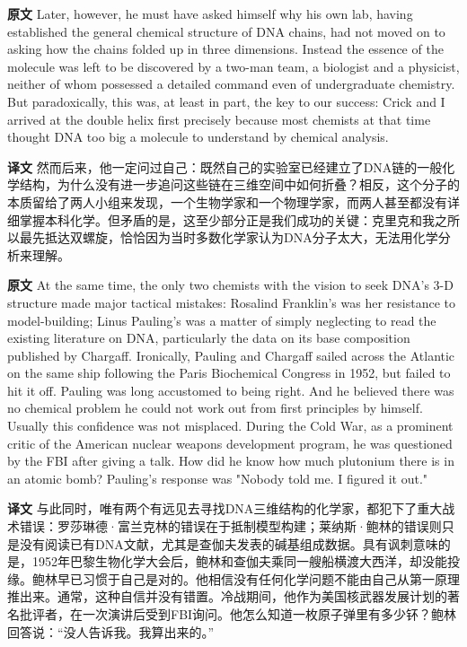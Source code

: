 \documentclass[UTF8,zihao=-4]{ctexart}
\newcommand{\BodyFont}{\fontsize{10.5pt}{15.5pt}\selectfont}
\renewenvironment{quote}{\par\noindent\begingroup\BodyFont}{\par\endgroup}
\begin{document}
\begin{quote}
\noindent\textbf{原文} Later, however, he must have asked himself why his own lab, having established the general chemical structure of DNA chains, had not moved on to asking how the chains folded up in three dimensions. Instead the essence of the molecule was left to be discovered by a two-man team, a biologist and a physicist, neither of whom possessed a detailed command even of undergraduate chemistry. But paradoxically, this was, at least in part, the key to our success: Crick and I arrived at the double helix first precisely because most chemists at that time thought DNA too big a molecule to understand by chemical analysis.

\smallskip
\noindent\textbf{译文} 然而后来，他一定问过自己：既然自己的实验室已经建立了DNA链的一般化学结构，为什么没有进一步追问这些链在三维空间中如何折叠？相反，这个分子的本质留给了两人小组来发现，一个生物学家和一个物理学家，而两人甚至都没有详细掌握本科化学。但矛盾的是，这至少部分正是我们成功的关键：克里克和我之所以最先抵达双螺旋，恰恰因为当时多数化学家认为DNA分子太大，无法用化学分析来理解。
\end{quote}

\begin{quote}
\noindent\textbf{原文} At the same time, the only two chemists with the vision to seek DNA's 3-D structure made major tactical mistakes: Rosalind Franklin's was her resistance to model-building; Linus Pauling's was a matter of simply neglecting to read the existing literature on DNA, particularly the data on its base composition published by Chargaff. Ironically, Pauling and Chargaff sailed across the Atlantic on the same ship following the Paris Biochemical Congress in 1952, but failed to hit it off. Pauling was long accustomed to being right. And he believed there was no chemical problem he could not work out from first principles by himself. Usually this confidence was not misplaced. During the Cold War, as a prominent critic of the American nuclear weapons development program, he was questioned by the FBI after giving a talk. How did he know how much plutonium there is in an atomic bomb? Pauling's response was "Nobody told me. I figured it out."

\smallskip
\noindent\textbf{译文} 与此同时，唯有两个有远见去寻找DNA三维结构的化学家，都犯下了重大战术错误：罗莎琳德·富兰克林的错误在于抵制模型构建；莱纳斯·鲍林的错误则只是没有阅读已有DNA文献，尤其是查伽夫发表的碱基组成数据。具有讽刺意味的是，1952年巴黎生物化学大会后，鲍林和查伽夫乘同一艘船横渡大西洋，却没能投缘。鲍林早已习惯于自己是对的。他相信没有任何化学问题不能由自己从第一原理推出来。通常，这种自信并没有错置。冷战期间，他作为美国核武器发展计划的著名批评者，在一次演讲后受到FBI询问。他怎么知道一枚原子弹里有多少钚？鲍林回答说：“没人告诉我。我算出来的。”
\end{quote}
\end{document}
